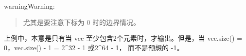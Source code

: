 \documentclass[letterpaper,10pt,english]{sphinxmanual}
\begin{document}
\begin{sphinxadmonition}{warning}{Warning:}\begin{quote}

 尤其是要注意下标为 0 时的边界情况。

%
\begin{sphinxVerbatim}[commandchars=\\\{\},numbers=left,firstnumber=1,stepnumber=1]
  
          
    \PYG{p}{[}\PYG{p}{]}  \PYG{p}{[}\PYG{p}{]}  
\end{sphinxVerbatim}
\end{quote}

上例中，本意是只有当 vec 至少包含2个元素时，才输出。但是，当 vec.size() = 0，vec.size() - 1 = 2\textasciicircum{}32 - 1 或2\textasciicircum{}64 - 1，
而不是预想的 -1。
\end{sphinxadmonition}
\end{document}
